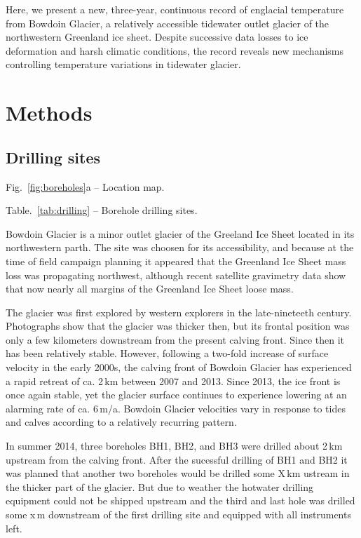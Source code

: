 \documentclass[utf8]{article}
\begin{document}
    Here, we present a new, three-year, continuous record of englacial
    temperature from Bowdoin Glacier, a relatively accessible tidewater outlet
    glacier of the northwestern Greenland ice sheet. Despite successive data
    losses to ice deformation and harsh climatic conditions, the record reveals
    new mechanisms controlling temperature variations in tidewater glacier.


\section{Methods}

\subsection{Drilling sites}

    Fig.~\ref{fig:boreholes}a -- Location map.

    Table.~\ref{tab:drilling} -- Borehole drilling sites.

    Bowdoin Glacier is a minor outlet glacier of the Greeland Ice Sheet located
    in its northwestern parth. The site was choosen for its accessibility, and
    because at the time of field campaign planning it appeared that the
    Greenland Ice Sheet mass loss was propagating northwest, although recent
    satellite gravimetry data show that now nearly all margins of the Greenland
    Ice Sheet loose mass.

    The glacier was first explored by western explorers in the late-nineteeth
    century. Photographs show that the glacier was thicker then, but its
    frontal position was only a few kilometers downstream from the present
    calving front. Since then it has been relatively stable. However, following
    a two-fold increase of surface velocity in the early 2000s, the calving
    front of Bowdoin Glacier has experienced a rapid retreat of ca.  2\,km
    between 2007 and 2013. Since 2013, the ice front is once again stable, yet
    the glacier surface continues to experience lowering at an alarming rate of
    ca. 6\,m/a.  Bowdoin Glacier velocities vary in response to tides and
    calves according to a relatively recurring pattern.

    In summer 2014, three boreholes BH1, BH2, and BH3 were drilled about 2\,km
    upstream from the calving front. After the sucessful drilling of BH1 and
    BH2 it was planned that another two boreholes would be drilled some X\,km
    ustream in the thicker part of the glacier. But due to weather the
    hotwater drilling equipment could not be shipped upstream and the third
    and last hole was drilled some x\,m downstream of the first drilling site
    and equipped with all instruments left.
\end{document}

